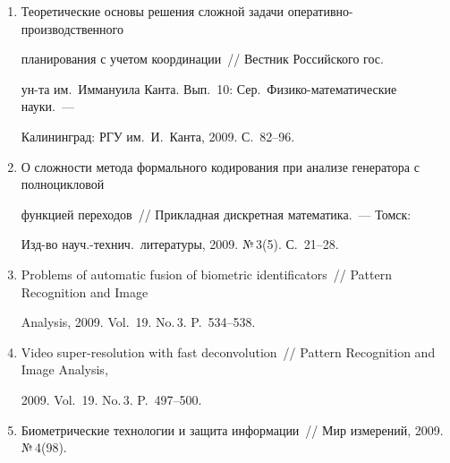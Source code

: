 \begin{enumerate}[1.]
\textit{гов В.\,А.} Анатолий Иванович Китов~--- пионер 


кибернетики, информатики и автоматизированных систем управления.~--- М.: 


КОС$\bullet$ИНФ, 2009. С.~213--219. 





\item {}


Теоретические основы решения сложной задачи оперативно-производственного 


планирования с учетом координации~// Вестник Российского гос.\ 


ун-та им.\ Иммануила Канта. Вып.~10: Сер.\ Физико-математические науки.~--- 


Калининград: РГУ им.\ И.~Канта, 2009. С.~82--96.





\item {}


О сложности метода формального кодирования при анализе генератора с полноцикловой 


функцией переходов~// Прикладная дискретная математика.~--- Томск: 


Изд-во науч.-технич.\ литературы, 2009. №\,3(5). С.~21--28.





\item {}


Problems of automatic fusion of biometric identificators~// Pattern Recognition and Image 


Analysis, 2009. Vol.~19. No.\,3. P.~534--538.





\item {}


Video super-\linebreak resolution with fast deconvolution~// Pattern Recognition and Image Analysis, 


2009. Vol.~19. No.\,3. P.~497--500.





\item {}


Биометрические технологии и защита информации~// Мир измерений, 2009. №\,4(98).  



\end{enumerate}
